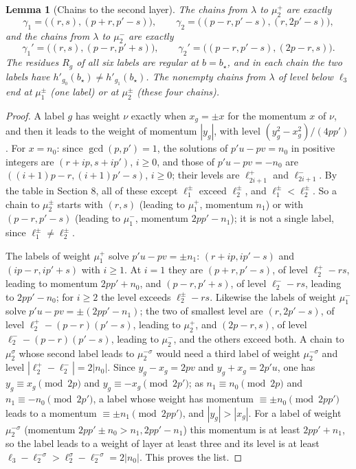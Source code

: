 \documentclass[11pt]{article}
\newtheorem{lemma}[theorem]{Lemma}
\theoremstyle{remark}
\begin{document}
\begin{lemma}[Chains to the second layer]\label{lem:chains2}
The chains from $\lambda$ to $\mu^+_2$ are exactly
\[
 \gamma_1=\bigl((r,s),(p+r,p'-s)\bigr),\qquad
 \gamma_2=\bigl((p-r,p'-s),(r,2p'-s)\bigr),
\]
and the chains from $\lambda$ to $\mu^-_2$ are exactly
\[
 \gamma_1'=\bigl((r,s),(p-r,p'+s)\bigr),\qquad
 \gamma_2'=\bigl((p-r,p'-s),(2p-r,s)\bigr).
\]
The residues $R_g$ of all six labels are regular at $b=b_\star$, and in each
chain the two labels have $h'_{g_0}(b_\star)\neq h'_{g_1}(b_\star)$.  The
nonempty chains from $\lambda$ of level below $\ell_3$ end at $\mu^\pm_1$ (one
label) or at $\mu^\pm_2$ (these four chains).
\end{lemma}

\begin{proof}
A label $g$ has weight $\nu$ exactly when $x_g=\pm x$ for the momentum $x$ of
$\nu$, and then it leads to the weight of momentum $|y_g|$, with level
$(y_g^2-x_g^2)/(4pp')$.  For $x=n_0$: since $\gcd(p,p')=1$, the solutions of
$p'u-pv=n_0$ in positive integers are $(r+ip,s+ip')$, $i\ge0$, and those of
$p'u-pv=-n_0$ are $((i+1)p-r,(i+1)p'-s)$, $i\ge0$; their levels are
$\ell^+_{2i+1}$ and $\ell^-_{2i+1}$.  By the table in Section 8, all of these
except $\ell^\pm_1$ exceed $\ell^\pm_2$, and $\ell^\pm_1<\ell^\pm_2$.  So a chain
to $\mu^\pm_2$ starts with $(r,s)$ (leading to $\mu^+_1$, momentum $n_1$) or
with $(p-r,p'-s)$ (leading to $\mu^-_1$, momentum $2pp'-n_1$); it is not a
single label, since $\ell^\pm_1\neq\ell^\pm_2$.

The labels of weight $\mu^+_1$ solve $p'u-pv=\pm n_1$: $(r+ip,ip'-s)$ and
$(ip-r,ip'+s)$ with $i\ge1$.  At $i=1$ they are $(p+r,p'-s)$, of level
$\ell^+_2-rs$, leading to momentum $2pp'+n_0$, and $(p-r,p'+s)$, of level
$\ell^-_2-rs$, leading to $2pp'-n_0$; for $i\ge2$ the level exceeds
$\ell^\pm_2-rs$.  Likewise the labels of weight $\mu^-_1$ solve
$p'u-pv=\pm(2pp'-n_1)$; the two of smallest level are $(r,2p'-s)$, of level
$\ell^+_2-(p-r)(p'-s)$, leading to $\mu^+_2$, and $(2p-r,s)$, of level
$\ell^-_2-(p-r)(p'-s)$, leading to $\mu^-_2$, and the others exceed both.  A
chain to $\mu^\sigma_2$ whose second label leads to $\mu^{-\sigma}_2$ would need
a third label of weight $\mu^{-\sigma}_2$ and level
$|\ell^+_2-\ell^-_2|=2|n_0|$.  Since $y_g-x_g=2pv$ and $y_g+x_g=2p'u$, one
has $y_g\equiv x_g\pmod{2p}$ and $y_g\equiv-x_g\pmod{2p'}$; as
$n_1\equiv n_0\pmod{2p}$ and $n_1\equiv-n_0\pmod{2p'}$, a label whose weight has
momentum $\equiv\pm n_0\pmod{2pp'}$ leads to a momentum $\equiv\pm
n_1\pmod{2pp'}$, and $|y_g|>|x_g|$.  For a label of weight $\mu^{-\sigma}_2$
(momentum $2pp'\pm n_0>n_1,2pp'-n_1$) this momentum is at least $2pp'+n_1$, so
the label leads to a weight of layer at least three and its level is at least
$\ell_3-\ell^{-\sigma}_2>\ell^\sigma_2-\ell^{-\sigma}_2=2|n_0|$.  This proves the
list.


\end{proof}
\end{document}
